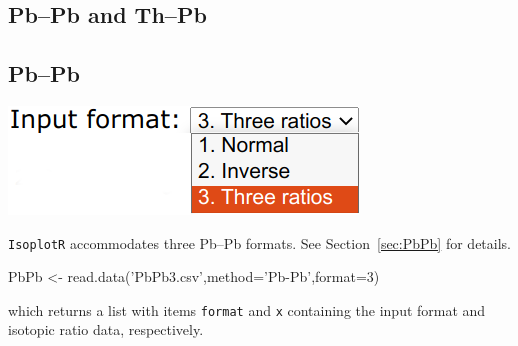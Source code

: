 \begin{refsection}

\chapter{Pb--Pb and Th--Pb}
\label{ch:ThPbPb-R}

\section{Pb--Pb}\label{sec:PbPb-R}

\noindent\begin{minipage}[t]{.3\linewidth}
\strut\vspace*{-\baselineskip}\newline
\includegraphics[width=\linewidth]{../figures/PbPbFormats.png}
\end{minipage}
\begin{minipage}[t]{.7\textwidth}
  \texttt{IsoplotR} accommodates three Pb--Pb formats. See
  Section~\ref{sec:PbPb} for details.
\end{minipage}

\begin{console}
PbPb <- read.data('PbPb3.csv',method='Pb-Pb',format=3)
\end{console}

\noindent which returns a list with items \texttt{format} and
\texttt{x} containing the input format and isotopic ratio data,
respectively.\\


\end{refsection}
